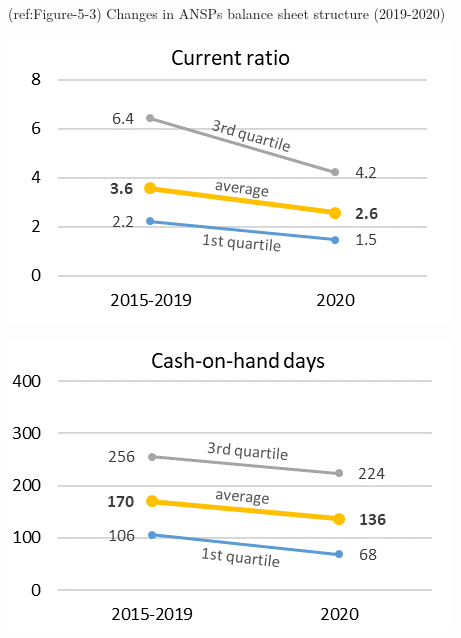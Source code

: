 \documentclass[
]{book}
\begin{document}
\begin{infobox}

\begin{left-narrow}

(ref:Figure-5-3) Changes in ANSPs balance sheet structure (2019-2020)

\begin{center}\includegraphics[width=1\linewidth]{figures/Figure-5-3} \end{center}

\begin{center}\includegraphics[width=1\linewidth]{figures/Figure-5-4} \end{center}

\begin{figure}


\end{figure}
\end{left-narrow}
\end{infobox}
\end{document}
